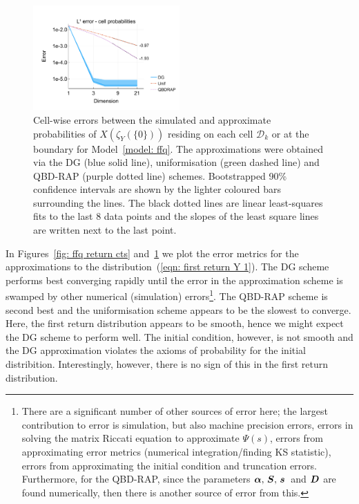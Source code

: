 \begin{figure}[h]
	\centering
	\includegraphics[width=0.5\textwidth,trim={0.75cm 0.8cm 0.25cm 1.25cm},clip]{chapter6/figs/ffq/cts/l1_cell_probs_error_formatted.pdf}%
	\caption{Cell-wise errors between the simulated and approximate probabilities of \(X(\zeta_{Y}(\{0\}))\) residing on each cell \(\mathcal D_k\) or at the boundary for Model~\ref{model: ffq}. The approximations were obtained via the DG (blue solid line), uniformisation (green dashed line) and QBD-RAP (purple dotted line) schemes. Bootstrapped 90\% confidence intervals are shown by the lighter coloured bars surrounding the lines. The black dotted lines are linear least-squares fits to the last 8 data points and the slopes of the least square lines are written next to the last point.} 
	\label{fig: ffq cell probs} 
\end{figure}
In Figures~\ref{fig: ffq return cts} and~\ref{fig: ffq cell probs} we plot the error metrics for the approximations to the distribution~(\ref{eqn: first return Y 1}). The DG scheme performs best converging rapidly until the error in the approximation scheme is swamped by other numerical (simulation) errors\footnote{There are a significant number of other sources of error here; the largest contribution to error is simulation, but also machine precision errors, errors in solving the matrix Riccati equation to approximate \(\mathbb \Psi(s)\), errors from approximating error metrics (numerical integration/finding KS statistic), errors from approximating the initial condition and truncation errors. Furthermore, for the QBD-RAP, since the parameters \(\boldsymbol \alpha,\,\boldsymbol S,\,\boldsymbol s\,\) and \(\boldsymbol D\) are found numerically, then there is another source of error from this.}. The QBD-RAP scheme is second best and the uniformisation scheme appears to be the slowest to converge. Here, the first return distribution appears to be smooth, hence we might expect the DG scheme to perform well. The initial condition, however, is not smooth and the DG approximation violates the axioms of probability for the initial distribition. Interestingly, however, there is no sign of this in the first return distribution. 
 

